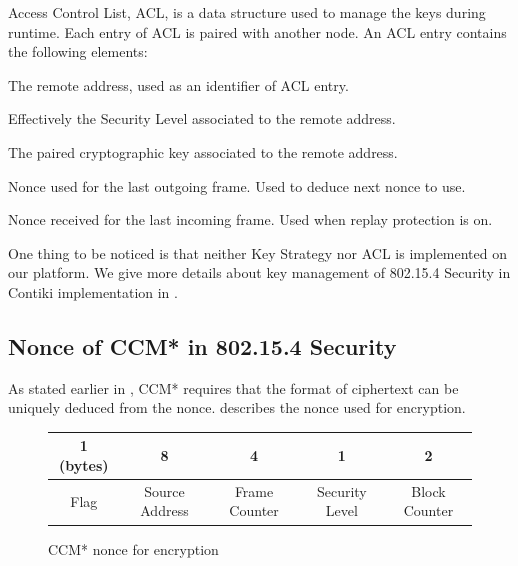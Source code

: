 Access Control List, ACL, is a data structure used to manage the keys during runtime. Each entry of ACL is paired with another node.  An ACL entry contains the following elements:
\begin{description}[style=nextline]
	\item[\textbf{Address}]
	The remote address, used as an identifier of ACL entry.
	\item[\textbf{Security Suite}]
	Effectively the Security Level associated to the remote address.
	\item[\textbf{Key}]
	The paired cryptographic key associated to the remote address.
	\item[\textbf{Last Initial Vector}]
	Nonce used for the last outgoing frame. Used to deduce next nonce to use.
	\item[\textbf{Replay Counter}]
	Nonce received for the last incoming frame. Used when replay protection is on.
\end{description}

One thing to be noticed is that neither Key Strategy nor ACL is implemented on our platform. We give more details about key management of 802.15.4 Security in Contiki implementation in .

\subsection{Nonce of CCM* in 802.15.4 Security} \label{Subsec: 802154 Nonce}
As stated earlier in , CCM* requires that the format of ciphertext can be uniquely deduced from the nonce.  describes the nonce used for encryption.

\begin{figure}[th!]
	\centering
	\begin{tabular}{|c|c|c|c|c|}
		\hline 
		1 (bytes) & 8              & 4             & 1              & 2             \\ \hline
		Flag      & Source Address & Frame Counter & Security Level & Block Counter \\ \hline
	\end{tabular}
	\caption{CCM* nonce for encryption}
	\label{Fig: CCM nonce}
\end{figure}

